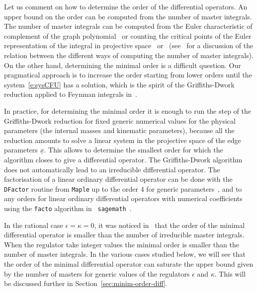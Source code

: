 \documentclass[a4paper,12pt]{article}
\numberwithin{equation}{section}
\numberwithin{figure}{section}
\begin{document}
\medskip
 
 Let us comment on how to determine the order of the differential operators. An upper bound on the order can be computed
 from the number of master integrals.
 The number of master
integrals  can be computed from the Euler
characteristic of complement of the graph polynomial~\cite{Bitoun:2017nre} or counting the
critical points of the Euler representation of the integral in
projective
space~\cite{Lee:2013hzt,Cacciatori:2021nli}
or~\cite{Mastrolia:2018uzb,Frellesvig:2019uqt} (see~\cite{Agostini:2022cgv} for
a discussion of the relation between the different ways of computing the number of master
integrals). On the other hand, determining the minimal order is a
difficult question. Our pragmatical approach is to increase the order
starting from 
lower orders until the system~\eqref{e:sysCFU} has a solution, which is
the spirit of the Griffiths-Dwork reduction applied to Feynman
integrals in~\cite{Muller-Stach:2011qkg}.

In practice, for determining the minimal order it is enough to run the step of the
Griffiths-Dwork reduction for fixed generic numerical values for the physical
parameters (the internal masses and kinematic
parameters), because all the reduction amounts to solve a linear system in the projective space of
the edge parameters $\underline x$. This allows to determine the smallest order for which the
algorithm closes to give a differential operator.
%
The Griffiths-Dwork algorithm does not automatically
lead to an irreducible differential operator.
The factorisation of a linear ordinary
differential operator can be done with the {\tt DFactor} routine from
{\tt Maple} up to the order 4 for generic parameters~\cite{PutSinger,vanHoeij}, and to any
orders for linear  ordinary
differential operators with numerical coefficients
using the {\tt facto} algorithm in {\tt
	sagemath}~\cite{chyzak2022symbolic,goyer2021sage}.


 In the rational case $\epsilon=\kappa=0$, it was noticed
in~\cite{Bloch:2013tra,Bloch:2016izu,Bloch:2014qca,Lairez:2022zkj} that the order of the minimal differential operator is
smaller than the number of irreducible master integrals.
When the regulator take integer values the minimal order is smaller
than the number of master integrals. 
In the various cases studied below,
we will see that the order of the minimal differential operator can saturate
the upper bound given by the number of masters for generic values of
the regulators  $\epsilon$  and $\kappa$. 
This will
      be discussed further in Section~\ref{sec:minim-order-diff}.
\end{document}

